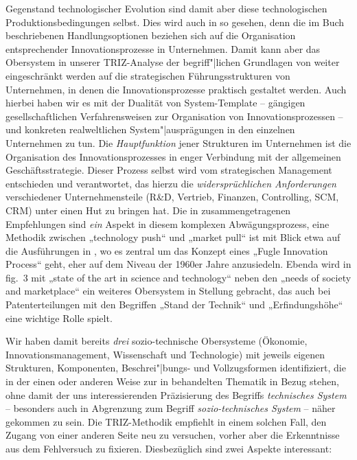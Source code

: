 \documentclass[11pt,a4paper]{article}
\begin{document}
Gegenstand technologischer Evolution sind damit aber diese technologischen
Produktionsbedingungen selbst. Dies wird auch in \cite{TESE2018} so gesehen,
denn die im Buch beschriebenen Handlungsoptionen beziehen sich auf die
Organisation entsprechender Innovationsprozesse in Unternehmen. Damit kann
aber das Obersystem in unserer TRIZ-Analyse der begriff"|lichen Grundlagen von
\cite{TESE2018} weiter eingeschränkt werden auf die strategischen
Führungsstrukturen von Unternehmen, in denen die Innovationsprozesse praktisch
gestaltet werden. Auch hierbei haben wir es mit der Dualität von
System-Template -- gängigen gesellschaftlichen Verfahrensweisen zur
Organisation von Innovationsprozessen -- und konkreten realweltlichen
System"|ausprägungen in den einzelnen Unternehmen zu tun. Die
\emph{Hauptfunktion} jener Strukturen im Unternehmen ist die Organisation des
Innovationsprozesses in enger Verbindung mit der allgemeinen
Geschäftsstrategie.  Dieser Prozess selbst wird vom strategischen Management
entschieden und verantwortet, das hierzu die \emph{widersprüchlichen
  Anforderungen} verschiedener Unternehmensteile (R\&D, Vertrieb, Finanzen,
Controlling, SCM, CRM) unter einen Hut zu bringen hat. Die in \cite{TESE2018}
zusammengetragenen Empfehlungen sind \emph{ein} Aspekt in diesem komplexen
Abwägungsprozess, eine Methodik zwischen „technology push“ und „market pull“
ist mit Blick etwa auf die Ausführungen in \cite{Preez2006}, wo es zentral um
das Konzept eines „Fugle Innovation Process“ geht, eher auf dem Niveau der
1960er Jahre anzusiedeln. Ebenda wird in fig.~3 mit „state of the art in
science and technology“ neben den „needs of society and marketplace“ ein
weiteres Obersystem in Stellung gebracht, das auch  bei Patenterteilungen mit
den Begriffen „Stand der Technik“ und „Erfindungshöhe“ eine wichtige Rolle
spielt.

Wir haben damit bereits \emph{drei} sozio-technische Obersysteme (Ökonomie,
Innovationsmanagement, Wissenschaft und Technologie) mit jeweils eigenen
Strukturen, Komponenten, Beschrei"|bungs- und Vollzugsformen identifiziert, die
in der einen oder anderen Weise zur in \cite{TESE2018} behandelten Thematik in
Bezug stehen, ohne damit der uns interessierenden Präzisierung des Begriffs
\emph{technisches System} -- besonders auch in Abgrenzung zum Begriff
\emph{sozio-technisches System} -- näher gekommen zu sein. Die TRIZ-Methodik
empfiehlt in einem solchen Fall, den Zugang von einer anderen Seite neu zu
versuchen, vorher aber die Erkenntnisse aus dem Fehlversuch zu fixieren.
Diesbezüglich sind zwei Aspekte interessant:
\end{document}
